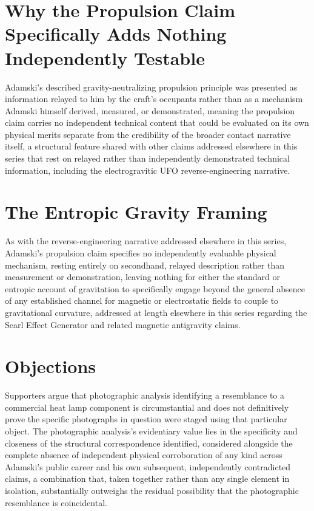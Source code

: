 \documentclass[11pt]{article}
\begin{document}
\section{Why the Propulsion Claim Specifically Adds Nothing Independently Testable}

Adamski's described gravity-neutralizing propulsion principle was presented as information relayed to him by the craft's occupants rather than as a mechanism Adamski himself derived, measured, or demonstrated, meaning the propulsion claim carries no independent technical content that could be evaluated on its own physical merits separate from the credibility of the broader contact narrative itself, a structural feature shared with other claims addressed elsewhere in this series that rest on relayed rather than independently demonstrated technical information, including the electrogravitic UFO reverse-engineering narrative.

\section{The Entropic Gravity Framing}

As with the reverse-engineering narrative addressed elsewhere in this series, Adamski's propulsion claim specifies no independently evaluable physical mechanism, resting entirely on secondhand, relayed description rather than measurement or demonstration, leaving nothing for either the standard or entropic account of gravitation to specifically engage beyond the general absence of any established channel for magnetic or electrostatic fields to couple to gravitational curvature, addressed at length elsewhere in this series regarding the Searl Effect Generator and related magnetic antigravity claims.

\section{Objections}

Supporters argue that photographic analysis identifying a resemblance to a commercial heat lamp component is circumstantial and does not definitively prove the specific photographs in question were staged using that particular object. The photographic analysis's evidentiary value lies in the specificity and closeness of the structural correspondence identified, considered alongside the complete absence of independent physical corroboration of any kind across Adamski's public career and his own subsequent, independently contradicted claims, a combination that, taken together rather than any single element in isolation, substantially outweighs the residual possibility that the photographic resemblance is coincidental.
\end{document}
